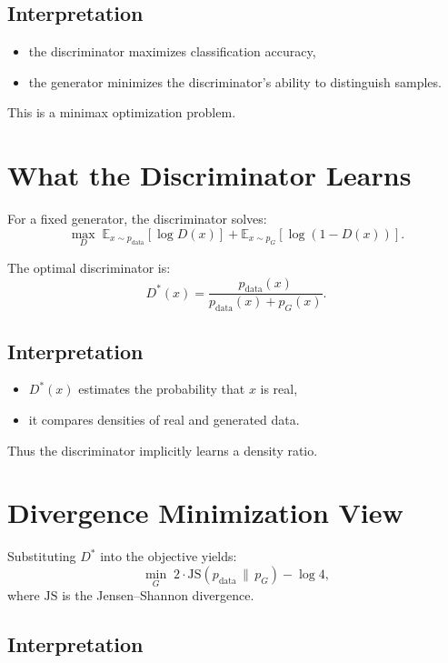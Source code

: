 \subsection{Interpretation}

\begin{itemize}
    \item the discriminator maximizes classification accuracy,
    \item the generator minimizes the discriminator's ability to distinguish samples.
\end{itemize}

This is a minimax optimization problem.

\section{What the Discriminator Learns}

For a fixed generator, the discriminator solves:
\[
\max_D \;
\mathbb{E}_{x \sim p_{\text{data}}}[\log D(x)]
+
\mathbb{E}_{x \sim p_G}[\log(1 - D(x))].
\]

\begin{proposition}
The optimal discriminator is:
\[
D^*(x)
=
\frac{p_{\text{data}}(x)}{p_{\text{data}}(x) + p_G(x)}.
\]
\end{proposition}

\subsection{Interpretation}

\begin{itemize}
    \item $D^*(x)$ estimates the probability that $x$ is real,
    \item it compares densities of real and generated data.
\end{itemize}

Thus the discriminator implicitly learns a density ratio.

\section{Divergence Minimization View}

Substituting $D^*$ into the objective yields:
\[
\min_G \; 2 \cdot \mathrm{JS}(p_{\text{data}} \,\|\, p_G) - \log 4,
\]
where $\mathrm{JS}$ is the Jensen--Shannon divergence.

\subsection{Interpretation}

